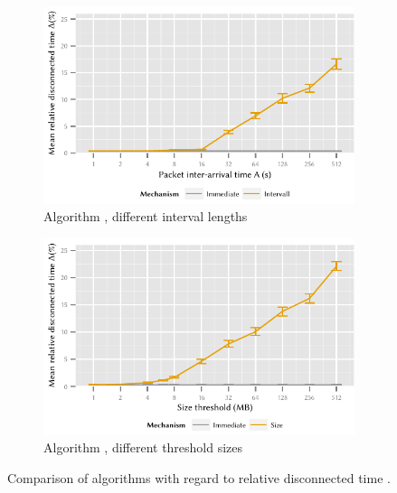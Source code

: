 \begin{figure}
	\begin{subfigure}[b]{\textwidth}
	\centering
	\includegraphics{application/cloud_file_synchronization/numerical_evaluation/figures/interval_disconnected}
	\caption{Algorithm \algointerval, different interval lengths}\label{fig:application:cloud_file_synchronisation:numerical_evaluation:disconnected:disconnected:interval}
	\end{subfigure} 
	\begin{subfigure}[b]{\textwidth}
	\centering
	\includegraphics{application/cloud_file_synchronization/numerical_evaluation/figures/size_disconnected}
	\caption{Algorithm \algosize, different threshold sizes}\label{fig:application:cloud_file_synchronisation:numerical_evaluation:disconnected:disconnected:size}
	\end{subfigure}

	\caption{Comparison of algorithms with regard to relative disconnected time \relativeDisconnectedTime.}\label{fig:application:cloud_file_synchronisation:numerical_evaluation:disconnected:disconnected}
\end{figure}

